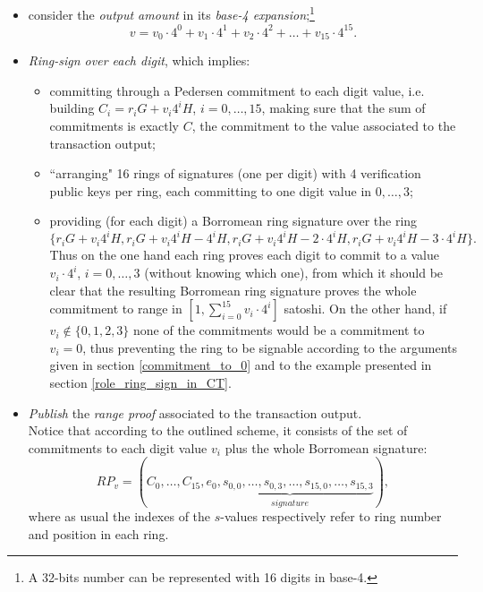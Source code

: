 \begin{itemize}[leftmargin=*]
    \item consider the \textit{output amount} in its \textit{base-4 expansion};\footnote{A 32-bits number can be represented with 16 digits in base-4.}
    \begin{equation*}
        v = v_0\cdot 4^0 + v_1\cdot 4^1 + v_2\cdot 4^2 + \dots + v_{15}\cdot 4^{15}.
    \end{equation*}
    \item \textit{Ring-sign over each digit}, which implies:
    \begin{itemize}
        \item committing through a Pedersen commitment to each digit value, i.e. building $C_i = r_iG + v_i4^iH$, $i=0,\dots,15$, making sure that the sum of commitments is exactly $C$, the commitment to the value associated to the transaction output;
        \item ``arranging" 16 rings of signatures (one per digit) with 4 verification public keys per ring, each committing to one digit value in $0,\dots,3$; 
        \item providing (for each digit) a Borromean ring signature over the ring
        \begin{equation*}
            \{r_iG + v_i4^iH, r_iG + v_i4^iH - 4^iH, r_iG + v_i4^iH - 2\cdot4^iH, r_iG + v_i4^iH - 3\cdot4^iH\}.
        \end{equation*}
        Thus on the one hand each ring proves each digit to commit to a value $v_i\cdot4^i$, $i=0,\dots,3$ (without knowing which one), from which it should be clear that the resulting Borromean ring signature proves the whole commitment to range in $[1, \sum\limits_{i=0}^{15}v_i\cdot4^i]$ satoshi. On the other hand, if $v_i \notin \{0,1,2,3\}$ none of the commitments would be a commitment to $v_i=0$, thus preventing the ring to be signable according to the arguments given in section \ref{commitment_to_0} and to the example presented in section \ref{role_ring_sign_in_CT}.
    \end{itemize}
    \item \textit{Publish} the \textit{range proof} associated to the transaction output.\\
    Notice that according to the outlined scheme, it consists of the set of commitments to each digit value $v_i$ plus the whole Borromean signature:
    \begin{equation*}
        RP_v = (C_0, \dots, C_{15}, \underbrace{e_0, s_{0,0}, \dots, s_{0,3}, \dots, s_{15,0}, \dots, s_{15,3}}_{signature}),
    \end{equation*}
    where as usual the indexes of the $s$-values respectively refer to ring number and position in each ring. 
\end{itemize}
